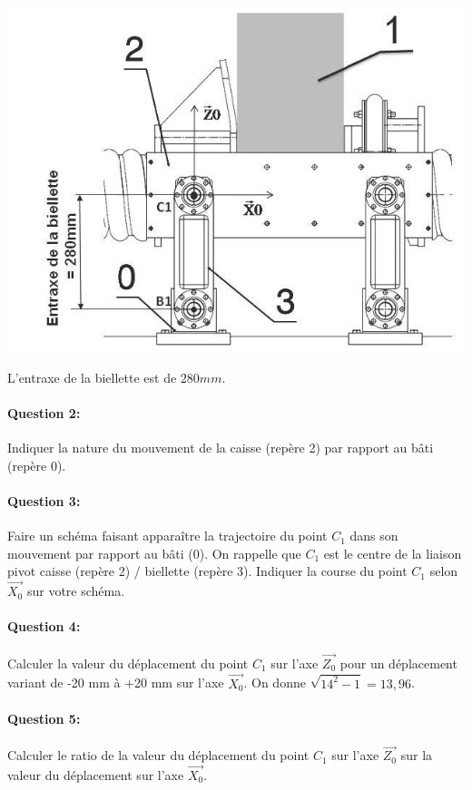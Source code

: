 \begin{center}
	\includegraphics[width=0.7\linewidth]{img/Decocheuse_struc}
\end{center}

L'entraxe de la biellette est de $280 mm$.


\paragraph{Question 2:} Indiquer la nature du mouvement de la caisse (repère 2) par rapport au bâti (repère 0).

\paragraph{Question 3:} Faire un schéma faisant apparaître la trajectoire du point $C_1$ dans son mouvement par rapport au bâti (0). On rappelle que $C_1$ est le centre de la liaison pivot caisse (repère 2) / biellette (repère 3). Indiquer la course du point $C_1$ selon $\overrightarrow{X_0}$ sur votre schéma.

\paragraph{Question 4:} Calculer la valeur du déplacement du point $C_1$ sur l'axe $\overrightarrow{Z_0}$ pour un déplacement variant de -20 mm à +20 mm sur l'axe $\overrightarrow{X_0}$. On donne $\sqrt{14^2-1}=13,96$.

\paragraph{Question 5:} Calculer le ratio de la valeur du déplacement du point $C_1$ sur l'axe $\overrightarrow{Z_0}$ sur la valeur du déplacement sur l'axe $\overrightarrow{X_0}$.

